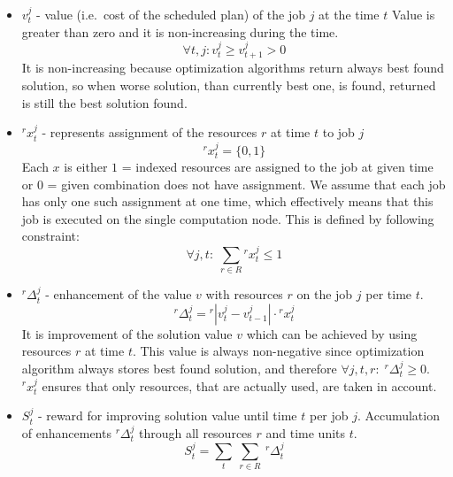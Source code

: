 \begin{itemize}
	\item $v_{t}^{j}$ - value (i.e.\ cost of the scheduled plan) of the job $j$ at the time $t$
	      Value is greater than zero and it is non-increasing during the time. 
	      \begin{equation}
	      	\forall t, j: v_{t}^{j} \geq v_{t+1}^{j} > 0 
	      \end{equation}
	      It is non-increasing because optimization algorithms return always best found solution, 
	      so when worse solution, than currently best one, is found,
	      returned is still the best solution found.
	\item $^{r}x_{t}^{j}$ - represents assignment of the resources $r$ at time $t$ to job $j$
	      \begin{equation}
	      	^{r}x_{t}^{j} = \{0, 1\} 
	      \end{equation}
	      Each $x$ is either $1$ = indexed resources are assigned to the job at given time or $0$ = given combination does not have assignment.
	      We assume that each job has only one such assignment at one time,
	      which effectively means that this job is executed on the single computation node.
	      This is defined by following constraint:
	      \begin{equation}
	      	\forall j, t:\; \sum_{r \in R} {}^{r}x_{t}^{j} \leq 1 
	      \end{equation}
	\item $^{r}\Delta_{t}^{j}$ - enhancement of the value $v$ with resources $r$ on the job $j$ per time $t$.
	      \begin{equation}
	      	^{r}\Delta_{t}^{j} = {}^{r}| v_{t}^{j} - v_{t-1}^{j}| \cdot {}^{r}x_{t}^{j}
	      \end{equation}
	      It is improvement of the solution value $v$ which can be achieved by using resources $r$ at time $t$.
	      This value is always non-negative since optimization algorithm always stores best found solution,
		  and therefore $\forall j, t, r:\; {}^{r}\Delta_{t}^{j} \geq 0$. 
		  ${}^{r}x_{t}^{j}$ ensures that only resources, 
		  that are actually used, are taken in account.
	\item $S_{t}^{j}$ - reward for improving solution value until time $t$ per job $j$.
	      Accumulation of enhancements $^{r}\Delta_{t}^{j}$ through all resources $r$ and time units $t$.
	      \begin{equation}
	      	S_{t}^{j} = \sum_{t}\:\sum_{r \in R}\: {}^{r}\Delta_{t}^{j} 

\end{equation}
\end{itemize}
